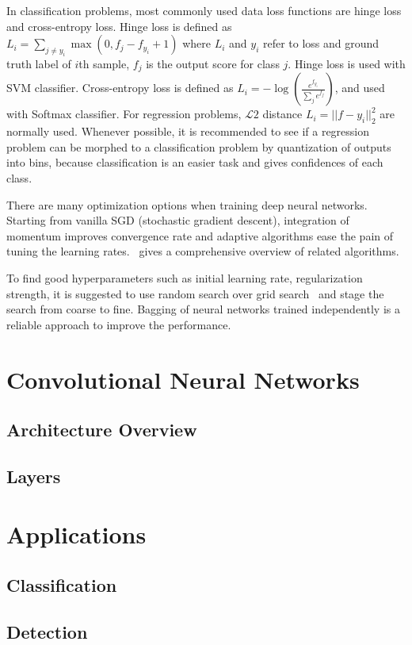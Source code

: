 \begin{description}[labelindent=1cm]
  \item[Loss Functions] In classification problems, most commonly used data loss functions are hinge loss and cross-entropy loss. Hinge loss is defined as $L_i = \sum_ {j\neq y_i} \max(0, f_j-f_{y_i}+1)$ where $L_i$ and $y_i$ refer to loss and ground truth label of $i$th sample, $f_j$ is the output score for class $j$. Hinge loss is used with SVM classifier. Cross-entropy loss is defined as $L_i = -\log(\frac{e^{f_{y_i}}}{\sum_je^{f_j}})$, and used with Softmax classifier. For regression problems, $\mathcal{L}2$ distance $L_i = ||f - y_i||_2^2$ are normally used. Whenever possible, it is recommended to see if a regression problem can be morphed to a classification problem by quantization of outputs into bins, because classification is an easier task and gives confidences of each class.
  \item[Optimization] There are many optimization options when training deep neural networks. Starting from vanilla SGD (stochastic gradient descent), integration of momentum improves convergence rate and adaptive algorithms ease the pain of tuning the learning rates. \cite{links:sgdoptimization}~gives a comprehensive overview of related algorithms.
  \item[Miscellous] To find good hyperparameters such as initial learning rate, regularization strength, it is suggested to use random search over grid search~\cite{bergstra2012random} and stage the search from coarse to fine. Bagging of neural networks trained independently is a reliable approach to improve the performance.
\end{description}


\section{Convolutional Neural Networks}

\subsection{Architecture Overview}

\subsection{Layers}

\section{Applications}

\subsection{Classification}

\subsection{Detection}


\newpage

